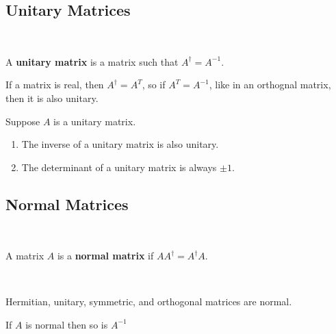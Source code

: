 \documentclass{article}
\begin{document}
\subsection{Unitary Matrices}
\ 

\begin{definition}
A \textbf{unitary matrix} is a matrix such that $A ^\dagger = A ^{-1}$. 
\end{definition}

If a matrix is real, then $A ^\dagger = A^T$, so if $A^T = A ^{-1}$, like in an orthognal matrix, then it is also unitary. 

\begin{proposition}
Suppose $A$ is a unitary matrix.
\begin{enumerate}
    \item The inverse of a unitary matrix is also unitary.
    \item The determinant of a unitary matrix is always $\pm 1$.  
\end{enumerate}
\end{proposition}

\subsection{Normal Matrices}
\ 
\begin{definition}
A matrix $A$ is a \textbf{normal matrix} if $AA ^\dagger = A ^\dagger A$.
\end{definition}

\begin{proposition}
    \
\item Hermitian, unitary, symmetric, and orthogonal matrices are normal.
\item If $A$ is normal then so is $A ^{-1}$
\end{proposition}
\end{document}
